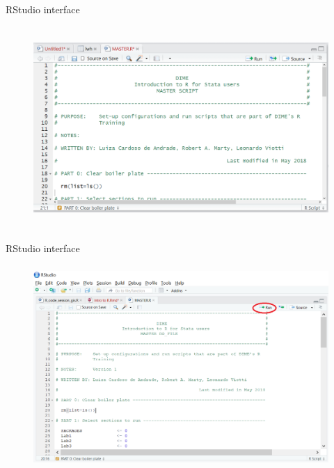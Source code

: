 \documentclass[ignorenonframetext,]{beamer}
\begin{document}
\begin{frame}{RStudio interface}

\begin{figure}
\centering
  \includegraphics[width=12cm,height=7.7cm]{img/scritpt1.png}
\end{figure}

\end{frame}

\begin{frame}{RStudio interface}

\begin{figure}
\centering
  \includegraphics[width=12cm,height=7.7cm]{img/scritpt2.png}
\end{figure}

\end{frame}
\end{document}

